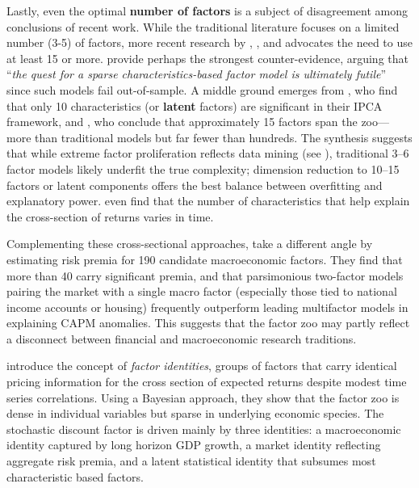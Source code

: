 Lastly, even the optimal \textbf{number of factors} is a subject of disagreement among conclusions of recent work. While the traditional literature focuses on a limited number (3-5) of factors, more recent research by \cite{martin2018transaction}, \cite{he2019factors}, \cite{kozak2019shrinking} and \cite{freyberger2020dissecting} advocates the need to use at least 15 or more. \cite{kozak2019shrinking} provide perhaps the strongest counter-evidence, arguing that ``\textit{the quest for a sparse characteristics-based factor model is ultimately futile}'' since such models fail out-of-sample. A middle ground emerges from \cite{kelly2019characteristics}, who find that only 10 characteristics (or \textbf{latent} factors) are significant in their IPCA framework, and \cite{swade2024factor}, who conclude that approximately 15 factors span the zoo---more than traditional models but far fewer than hundreds. The synthesis suggests that while extreme factor proliferation reflects data mining (see \cite{chen2024does}), traditional 3--6 factor models likely underfit the true complexity; dimension reduction to 10--15 factors or latent components offers the best balance between overfitting and explanatory power. \cite{green2017characteristics} even find that the number of characteristics that help explain the cross-section of returns varies in time.

Complementing these cross-sectional approaches, \cite{odoherty2025macroeconomic} take a different angle by estimating risk premia for 190 candidate macroeconomic factors. They find that more than 40 carry significant premia, and that parsimonious two-factor models pairing the market with a single macro factor (especially those tied to national income accounts or housing) frequently outperform leading multifactor models in explaining CAPM anomalies. This suggests that the factor zoo may partly reflect a disconnect between financial and macroeconomic research traditions.

\cite{huang2026identity} introduce the concept of \textit{factor identities}, groups of factors that carry identical pricing information for the cross section of expected returns despite modest time series correlations. Using a Bayesian approach, they show that the factor zoo is dense in individual variables but sparse in underlying economic species. The stochastic discount factor is driven mainly by three identities: a macroeconomic identity captured by long horizon GDP growth, a market identity reflecting aggregate risk premia, and a latent statistical identity that subsumes most characteristic based factors.

